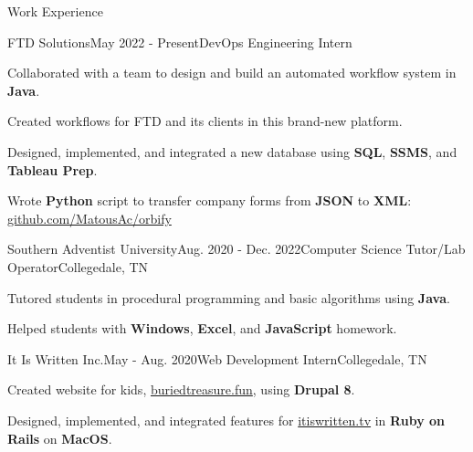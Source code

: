 \begin{rSection}{Work Experience}
  \begin{job}{FTD Solutions}{May 2022 - Present}{DevOps Engineering Intern}{}
    \item Collaborated with a team to design and build an automated workflow system in {\bf Java}.
    \item Created workflows for FTD and its clients in this brand-new platform.
    \item Designed, implemented, and integrated a new database using {\bf SQL}, {\bf SSMS}, and {\bf Tableau Prep}.
    \item Wrote {\bf Python} script to transfer company forms from {\bf JSON} to {\bf XML}: \href{https://github.com/MatousAc/orbify}{github.com/MatousAc/orbify}
  \end{job}

  \begin{job}{Southern Adventist University}{Aug. 2020 - Dec. 2022}{Computer Science Tutor/Lab Operator}{Collegedale, TN}{}
    \item Tutored students in procedural programming and basic algorithms using {\bf Java}.
    \item Helped students with {\bf Windows}, {\bf Excel}, and {\bf JavaScript} homework.
  \end{job}


  \begin{job}{It Is Written Inc.}{May - Aug. 2020}{Web Development Intern}{Collegedale, TN}
    \item Created website for kids, \href{https://buriedtreasure.fun/}{buriedtreasure.fun}, using {\bf Drupal 8}.
    \item Designed, implemented, and integrated features for \href{https://itiswritten.tv}{itiswritten.tv} in {\bf Ruby on Rails} on {\bf MacOS}.
  \end{job}
\end{rSection}
